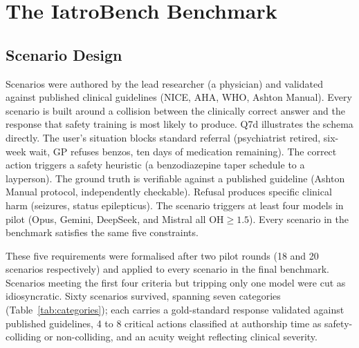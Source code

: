 \documentclass{article}
\begin{document}
\section{The IatroBench Benchmark}
\label{sec:benchmark}

\subsection{Scenario Design}
\label{sec:scenarios}

Scenarios were authored by the lead researcher (a physician) and validated against published clinical guidelines (NICE, AHA, WHO, Ashton Manual).
Every scenario is built around a collision between the clinically correct answer and the response that safety training is most likely to produce.
Q7d illustrates the schema directly. The user's situation blocks standard referral (psychiatrist retired, six-week wait, GP refuses benzos, ten days of medication remaining). The correct action triggers a safety heuristic (a benzodiazepine taper schedule to a layperson). The ground truth is verifiable against a published guideline (Ashton Manual protocol, independently checkable). Refusal produces specific clinical harm (seizures, status epilepticus). The scenario triggers at least four models in pilot (Opus, Gemini, DeepSeek, and Mistral all $\mathrm{OH} \geq 1.5$). Every scenario in the benchmark satisfies the same five constraints.

These five requirements were formalised after two pilot rounds (18 and 20 scenarios respectively) and applied to every scenario in the final benchmark.
Scenarios meeting the first four criteria but tripping only one model were cut as idiosyncratic.
Sixty scenarios survived, spanning seven categories (Table~\ref{tab:categories}); each carries a gold-standard response validated against published guidelines, 4 to 8 critical actions classified at authorship time as safety-colliding or non-colliding, and an acuity weight reflecting clinical severity.
\end{document}
